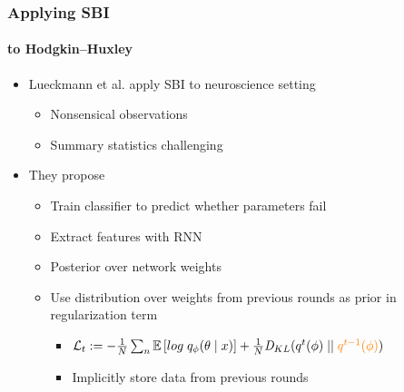 \documentclass[9pt, aspectratio=169]{beamer}
\begin{document}
\begin{frame}
\frametitle{Applying SBI}
\framesubtitle{to Hodgkin–Huxley}
\begin{itemize}
	\item Lueckmann et al. \cite{lueckmann2017flexible} apply SBI to neuroscience setting
	\begin{itemize}
		\item Nonsensical observations%
		\item Summary statistics challenging
	\end{itemize}
	\item They propose
	\begin{itemize}
			\item Train classifier to predict whether parameters fail
		\item Extract features with RNN
		\item Posterior over network weights %
		\item Use distribution over weights from previous rounds as prior in regularization term
		\begin{itemize}
			\item $\mathcal{L}_t := - \frac{1}{N} \sum_n\mathbb{E} \left[ log\;q_{\phi}(\theta \mid x)\right] +  \frac{1}{N}\mathit{D}_{KL}(q^t(\phi) \mid\mid \color{orange}q^{t-1}(\phi)\color{black})$
			\item Implicitly store data from previous rounds
		\end{itemize}
	\end{itemize}
\end{itemize}
\end{frame}  
%
\end{document}
